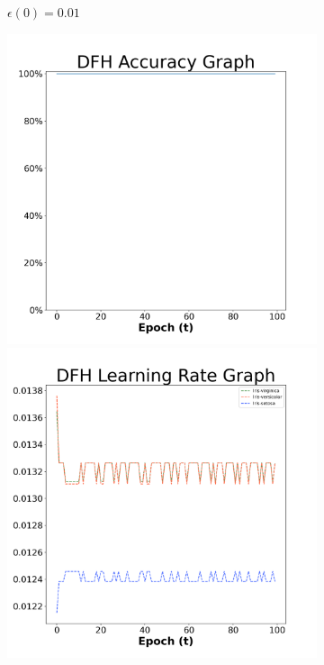 \begin{figure}[H]
\begin{subfigure}{0.3\textwidth}
  \caption{$\epsilon(0)=0.01$}
\end{subfigure}\hfil %
\begin{subfigure}{0.3\textwidth}
  \includegraphics[width=\linewidth]{images/exper1/iris/DFH_0.03_acc.png}
  \includegraphics[width=\linewidth]{images/exper1/iris/DFH_0.03_lr.png}

\end{subfigure}
\end{figure}
